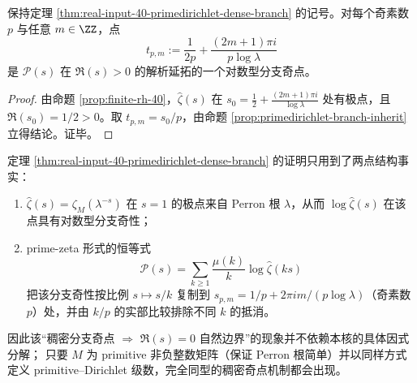 \begin{corollary}[toy-RH 临界线极点诱导的 \texorpdfstring{$\Re(s)=\frac{1}{2p}$}{Re(s)=1/(2p)} 分支点族]\label{cor:real-input-40-primedirichlet-branch-halfp}
保持定理 \ref{thm:real-input-40-primedirichlet-dense-branch} 的记号。对每个奇素数 \(p\) 与任意 \(m\in\ZZ\)，点
\[
t_{p,m}:=\frac{1}{2p}+\frac{(2m+1)\pi i}{p\log\lambda}
\]
是 \(\mathcal{P}(s)\) 在 \(\Re(s)>0\) 的解析延拓的一个对数型分支奇点。
\end{corollary}
\begin{proof}
由命题 \ref{prop:finite-rh-40}，\(\widehat{\zeta}(s)\) 在
\(
s_0=\frac12+\frac{(2m+1)\pi i}{\log\lambda}
\)
处有极点，且 \(\Re(s_0)=1/2>0\)。取 \(t_{p,m}=s_0/p\)，由命题 \ref{prop:primedirichlet-branch-inherit} 立得结论。证毕。
\end{proof}

\begin{remark}[自然边界机制的普适化]\label{rem:primedirichlet-natural-boundary-universal}
定理 \ref{thm:real-input-40-primedirichlet-dense-branch} 的证明只用到了两点结构事实：
\begin{enumerate}
  \item $\widehat{\zeta}(s)=\zeta_M(\lambda^{-s})$ 在 $s=1$ 的极点来自 Perron 根 $\lambda$，从而 $\log\widehat{\zeta}(s)$ 在该点具有对数型分支奇性；
  \item prime-zeta 形式的恒等式
  \[
  \mathcal{P}(s)=\sum_{k\ge 1}\frac{\mu(k)}{k}\log\widehat{\zeta}(ks)
  \]
  把该分支奇性按比例 $s\mapsto s/k$ 复制到 $s_{p,m}=1/p+2\pi i m/(p\log\lambda)$（奇素数 $p$）处，并由 $k/p$ 的实部比较排除不同 $k$ 的抵消。
\end{enumerate}
因此该“稠密分支奇点 \(\Rightarrow\) \(\Re(s)=0\) 自然边界”的现象并不依赖本核的具体因式分解；
只要 $M$ 为 primitive 非负整数矩阵（保证 Perron 根简单）并以同样方式定义 primitive--Dirichlet 级数，完全同型的稠密奇点机制都会出现。
\end{remark}

